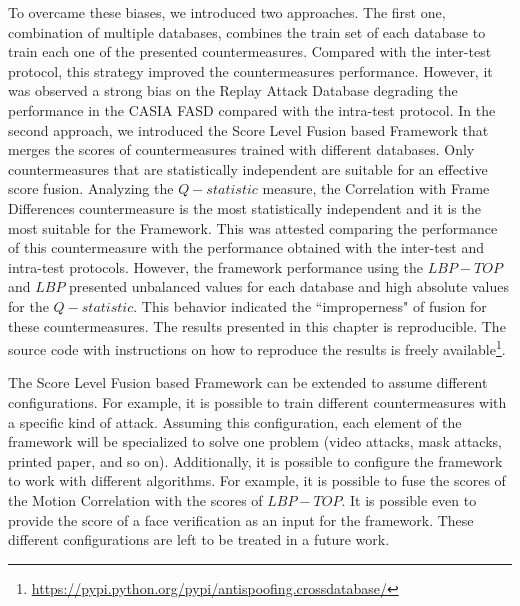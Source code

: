 To overcame these biases, we introduced two approaches. The first one, combination of multiple databases, combines the train set of each database to train each one of the presented countermeasures. Compared with the inter-test protocol, this strategy improved the countermeasures performance. However, it was observed a strong bias on the Replay Attack Database degrading the performance in the CASIA FASD compared with the intra-test protocol. In the second approach, we introduced the Score Level Fusion based Framework that merges the scores of countermeasures trained with different databases. Only countermeasures that are statistically independent are suitable for an effective score fusion. Analyzing the $Q-statistic$ measure, the Correlation with Frame Differences countermeasure is the most statistically independent and it is the most suitable for the Framework. This was attested comparing the performance of this countermeasure with the performance obtained with the inter-test and intra-test protocols.  However, the framework performance using the $LBP-TOP$ and $LBP$ presented unbalanced values for each database and high absolute values for the $Q-statistic$. This behavior indicated the ``improperness" of fusion for these countermeasures. The results presented in this chapter is reproducible. The source code with instructions on how to reproduce the results is freely available\footnote{\url{https://pypi.python.org/pypi/antispoofing.crossdatabase/}}.

The Score Level Fusion based Framework can be extended to assume different configurations. For example, it is possible to train different countermeasures with a specific kind of attack. Assuming this configuration, each element of the framework will be specialized to solve one problem (video attacks, mask attacks, printed paper, and so on).
Additionally, it is possible to configure the framework to work with different algorithms. For example, it is possible to fuse the scores of the Motion Correlation with the scores of $LBP-TOP$. It is possible even to provide the score of a face verification as an input for the framework. These different configurations are left to be treated in a future work.


